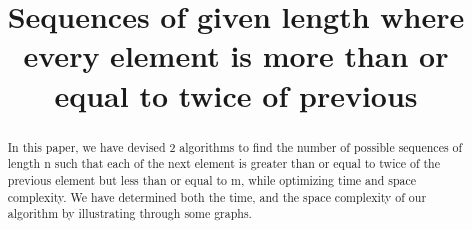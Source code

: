 \documentclass[conference]{IEEEtran}
\begin{document}
\title{Sequences of given length where every element is more than or equal to twice of previous\\
}

\author{
\and
{}
\and
{}
}

\maketitle

\begin{abstract}
In this paper, we have devised 2 algorithms to find the number of possible sequences of length n such that each of the next element is greater than or equal to twice of the previous element but less than or equal to m, while optimizing time and space complexity. We have determined both the time, and the space complexity of our algorithm by illustrating through some graphs.
\end{abstract}
\end{document}
